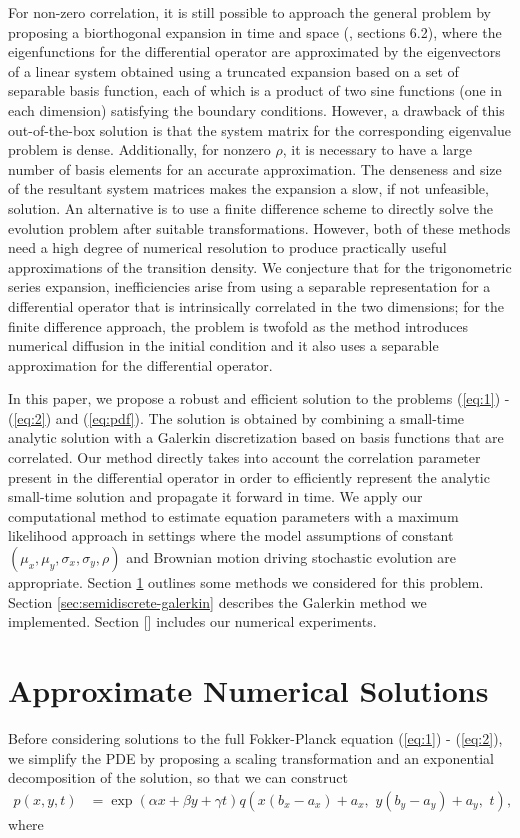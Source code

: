 \documentclass[10pt]{article}
\begin{document}
For non-zero correlation, it is still possible to approach the general
problem by proposing a biorthogonal expansion in time and space
(\cite{risken1989fokker-planck}, sections 6.2), where the
eigenfunctions for the differential operator are approximated
 by the
eigenvectors of a linear system obtained using a truncated expansion
based on a set of separable basis function, each of which is a product
of two sine functions (one in each dimension) satisfying the boundary
conditions. However, a drawback of this out-of-the-box solution is
that the system matrix for the corresponding eigenvalue problem is
dense. Additionally, for nonzero $\rho$, it is necessary to have a
large number of basis elements for an accurate approximation. The
denseness and size of the resultant system matrices makes the
expansion a slow, if not unfeasible, solution. An alternative is to
use a finite difference scheme to directly solve the evolution problem
after suitable transformations. However, both of these methods need a
high degree of numerical resolution to produce practically useful
approximations of the transition density. We conjecture that for the
trigonometric series expansion, inefficiencies arise from using
a separable representation for a differential operator that is
intrinsically correlated in the two dimensions; for the finite
difference approach, the problem is twofold as the method introduces
numerical diffusion in the initial condition and it also uses a
separable approximation for the differential operator.

In this paper, we propose a robust and efficient solution to the
problems (\ref{eq:1}) - (\ref{eq:2}) and (\ref{eq:pdf}). The solution
is obtained by combining a small-time analytic solution with a
Galerkin discretization based on basis functions that are
correlated. Our method directly takes into account the correlation
parameter present in the differential operator in order to efficiently
represent the analytic small-time solution and propagate it forward in
time. We apply our computational method to estimate equation
parameters with a maximum likelihood approach in settings where the
model assumptions of constant
$(\mu_x, \mu_y, \sigma_x, \sigma_y, \rho)$ and Brownian motion driving
stochastic evolution are appropriate. Section
\ref{sec:approximate-sols} outlines some methods we considered for
this problem. Section \ref{sec:semidiscrete-galerkin} describes the
Galerkin method we implemented. Section [] includes our numerical
experiments.


\section{Approximate Numerical Solutions} \label{sec:approximate-sols}
Before considering solutions to the full Fokker-Planck equation
(\ref{eq:1}) - (\ref{eq:2}), we simplify the PDE by proposing a
scaling transformation and an exponential decomposition of the
solution, so that we can construct
\begin{align}
  p(x,y,t) &= \exp(\alpha x + \beta y + \gamma t) q\left( x(b_x - a_x) + a_x, \,\, y(b_y - a_y) + a_y, \,\, t \right), \label{eq:q-to-p}
\end{align}
where
\end{document}
